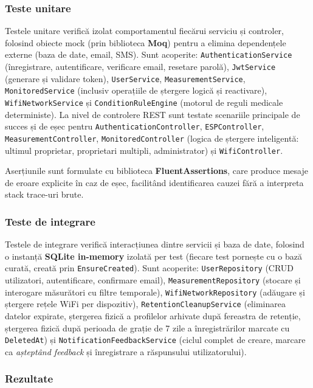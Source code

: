 \subsubsection{Teste unitare}

Testele unitare verifică izolat comportamentul fiecărui serviciu și controler, folosind obiecte mock (prin biblioteca \textbf{Moq}) pentru a elimina dependențele externe (baza de date, email, SMS). Sunt acoperite: \texttt{AuthenticationService} (înregistrare, autentificare, verificare email, resetare parolă), \texttt{JwtService} (generare și validare token), \texttt{UserService}, \texttt{MeasurementService}, \texttt{MonitoredService} (inclusiv operațiile de ștergere logică și reactivare), \texttt{WifiNetworkService} și \texttt{ConditionRuleEngine} (motorul de reguli medicale deterministe). La nivel de controlere REST sunt testate scenariile principale de succes și de eșec pentru \texttt{AuthenticationController}, \texttt{ESPController}, \texttt{MeasurementController}, \texttt{MonitoredController} (logica de ștergere inteligentă: ultimul proprietar, proprietari multipli, administrator) și \texttt{WifiController}.

Aserțiunile sunt formulate cu biblioteca \textbf{FluentAssertions}, care produce mesaje de eroare explicite în caz de eșec, facilitând identificarea cauzei fără a interpreta stack trace-uri brute.

\subsubsection{Teste de integrare}

Testele de integrare verifică interacțiunea dintre servicii și baza de date, folosind o instanță \textbf{SQLite in-memory} izolată per test (fiecare test pornește cu o bază curată, creată prin \texttt{EnsureCreated}). Sunt acoperite: \texttt{UserRepository} (CRUD utilizatori, autentificare, confirmare email), \texttt{MeasurementRepository} (stocare și interogare măsurători cu filtre temporale), \texttt{WifiNetworkRepository} (adăugare și ștergere rețele WiFi per dispozitiv), \texttt{RetentionCleanupService} (eliminarea datelor expirate, ștergerea fizică a profilelor arhivate după fereastra de retenție, ștergerea fizică după perioada de grație de 7 zile a înregistrărilor marcate cu \texttt{DeletedAt}) și \texttt{NotificationFeedbackService} (ciclul complet de creare, marcare ca \textit{așteptând feedback} și înregistrare a răspunsului utilizatorului).

\subsubsection{Rezultate}

